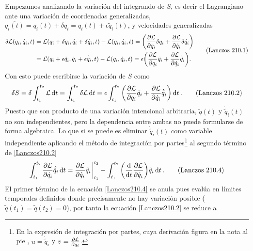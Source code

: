 \documentclass[12pt, spanish, a4paper, ]{article}
\begin{document}
Empezamos analizando la variación del integrando de \(S\), es decir el Lagrangiano ante una variación de coordenadas generalizadas, \(\overline{q_i (t)}= q_i(t) + \delta q_i = q_i (t)+ \epsilon \tilde{q}_i (t)\), y velocidades generalizadas
\begin{equation}\label{Lanczos210.1}
	\begin{aligned}
		\delta \mathcal{L}(q_i, \dot{q}_i, t)
		&= \mathcal{L}(q_i+ \delta{q}_i, \dot{q}_i+ \delta \dot{q}_i, t) - \mathcal{L}(q_i, \dot{q}_i, t)
		= \pqty{\pdv{\mathcal{L}}{q_i} \delta q_i + \pdv{\mathcal{L}}{\dot{q}_i} \delta \dot{q}_i } \notag \\
		&= \mathcal{L}(q_i+ \epsilon \tilde{q}_i, \dot{q}_i+ \epsilon \dot{\tilde{q}}_i, t) - \mathcal{L}(q_i, \dot{q}_i, t)
		= \epsilon \pqty{\pdv{\mathcal{L}}{q_i} \tilde{q}_i + \pdv{\mathcal{L}}{\dot{q}_i} \dot{\tilde{q}}_i }.
	\end{aligned}
  \tag{Lanczos 210.1}
\end{equation}
Con esto puede escribirse la variación de \(S\) como
\begin{equation}\label{Lanczos210.2}
    \delta S= \delta \int_{t_1}^{t_2 } \mathcal{L} \dd{t} = \int_{t_1}^{t_2 } \delta \mathcal{L} \dd{t} =
    \epsilon \int_{t_1}^{t_2 } \pqty{\pdv{\mathcal{L}}{q_i} \tilde{q}_i + \pdv{\mathcal{L}}{\dot{q}_i} \dot{\tilde{q}}_i } \dd{t}.
    \tag{Lanczos 210.2}
\end{equation}
Puesto que son producto de una variación intencional arbitraria, \(\tilde{q}(t)\) y \(\dot{\tilde{q}}_i(t)\) no son independientes, pero la dependencia entre ambas no puede formularse de forma algebraica.
Lo que si se puede es eliminar \(\dot{\tilde{q}}_i (t)\) como variable independiente aplicando el método de integración por partes\footnote{En la expresión de integración por partes, cuya derivación figura en la nota al pie , \(u = \dot{\tilde{q}}_i \) y \(v = \pdv{\mathcal{L}}{\dot{q}_i} \).} al segundo término de \eqref{Lanczos210.2}
\begin{equation}\label{Lanczos210.4}
    \int_{t_1}^{t_2 } \pdv{\mathcal{L}}{\dot{q}_i} \dot{\tilde{q}}_i \dd{t} =
    \pdv{\mathcal{L}}{\dot{q}_i} \tilde{q}_i \eval_{t_1}^{t_2} - \int_{t_1}^{t_2 } \pqty{ \dv{t} \pdv{\mathcal{L}}{\dot{q}_i} } \tilde{q}_i \dd{t}.
    \tag{Lanczos 210.4}
\end{equation}
El primer término de la ecuación \eqref{Lanczos210.4} se anula pues evalúa en límites temporales definidos donde precisamente no hay variación posible (\(\tilde{q}(t_1)= \tilde{q}(t_2)= 0\)), por tanto la ecuación \eqref{Lanczos210.2} se reduce a 
\end{document}
